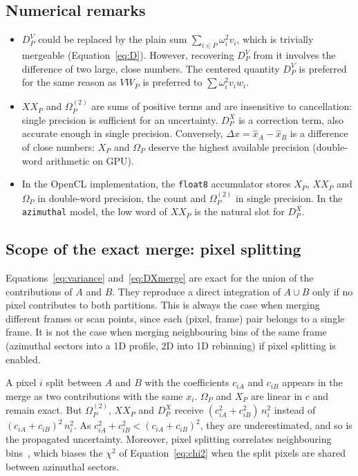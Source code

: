 \documentclass[a4paper,11pt]{article}
\newcommand{\mean}[1]{\widehat{#1}}
\newcommand{\Om}{\Omega}
\newcommand{\OmS}{\Omega^{(2)}}
\newcommand{\D}[2]{D^{#1}_{#2}}
\begin{document}
\subsection{Numerical remarks}

\begin{itemize}
\item $\D{V}{P}$ could be replaced by the plain sum $\sum_{i\in P}\omega_i^2 v_i$, which is trivially
  mergeable (Equation~\eqref{eq:D}). However, recovering $\D{V}{P}$ from it involves the difference of two
  large, close numbers. The centered quantity $\D{V}{P}$ is preferred for the same reason as $VW_P$ is
  preferred to $\sum\omega_i^2 v_i w_i$.
\item $XX_P$ and $\OmS_P$ are sums of positive terms and are insensitive to cancellation: single
  precision is sufficient for an uncertainty. $\D{X}{P}$ is a correction term, also accurate enough in
  single precision. Conversely, $\Delta x = \mean{x}_A - \mean{x}_B$ is a difference of close numbers:
  $X_P$ and $\Om_P$ deserve the highest available precision (double-word arithmetic on GPU).
\item In the OpenCL implementation, the \texttt{float8} accumulator stores $X_P$, $XX_P$ and $\Om_P$ in
  double-word precision, the count and $\OmS_P$ in single precision. In the \texttt{azimuthal} model, the
  low word of $XX_P$ is the natural slot for $\D{X}{P}$.
\end{itemize}

\subsection{Scope of the exact merge: pixel splitting}
\label{sec:splitting}

Equations~\eqref{eq:variance} and~\eqref{eq:DXmerge} are exact for the union of the contributions of
$A$ and $B$. They reproduce a direct integration of $A\cup B$ only if no pixel contributes to both
partitions. This is always the case when merging different frames or scan points, since each (pixel,
frame) pair belongs to a single frame. It is not the case when merging neighbouring bins of the same
frame (azimuthal sectors into a 1D profile, 2D into 1D rebinning) if pixel splitting is enabled.

A pixel $i$ split between $A$ and $B$ with the coefficients $c_{iA}$ and $c_{iB}$ appears in the merge as
two contributions with the same $x_i$. $\Om_P$ and $X_P$ are linear in $c$ and remain exact. But $\OmS_P$,
$XX_P$ and $\D{X}{P}$ receive $(c_{iA}^2+c_{iB}^2)\,n_i^2$ instead of $(c_{iA}+c_{iB})^2\,n_i^2$. As
$c_{iA}^2+c_{iB}^2 < (c_{iA}+c_{iB})^2$, they are underestimated, and so is the propagated uncertainty.
Moreover, pixel splitting correlates neighbouring bins~\cite{Yang14}, which biases the $\chi^2$ of
Equation~\eqref{eq:chi2} when the split pixels are shared between azimuthal sectors.
\end{document}

